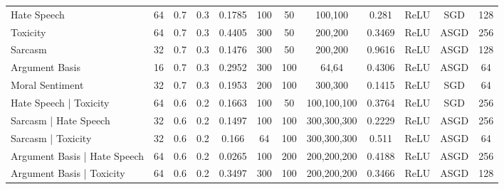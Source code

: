 \begin{landscape}
\begin{table}[]
{\begin{tabular}{l|ccccccccccc}
      Hate Speech                                       & 64         & 0.7              & 0.3              & 0.1785  & 100           & 50     & 100,100         & 0.281         & ReLU          & SGD       & 128        \\
      Toxicity                                          & 64         & 0.7              & 0.3              & 0.4405  & 300           & 50     & 200,200         & 0.3469        & ReLU          & ASGD      & 256        \\
      Sarcasm                                           & 32         & 0.7              & 0.3              & 0.1476  & 300           & 50     & 200,200         & 0.9616        & ReLU          & ASGD      & 128        \\
      Argument Basis                                    & 16         & 0.7              & 0.3              & 0.2952  & 300           & 100    & 64,64           & 0.4306        & ReLU          & ASGD      & 64         \\
      Moral Sentiment                                   & 32         & 0.7              & 0.3              & 0.1953  & 200           & 100    & 300,300         & 0.1415        & ReLU          & SGD       & 64         \\ \hline
      Hate Speech | Toxicity                            & 64         & 0.6              & 0.2              & 0.1663  & 100           & 50     & 100,100,100     & 0.3764        & ReLU          & SGD       & 256        \\
      Sarcasm | Hate Speech                             & 32         & 0.6              & 0.2              & 0.1497  & 100           & 100    & 300,300,300     & 0.2229        & ReLU          & ASGD      & 256        \\
      Sarcasm | Toxicity                                & 32         & 0.6              & 0.2              & 0.166   & 64            & 100    & 300,300,300     & 0.511         & ReLU          & ASGD      & 64         \\
      Argument Basis | Hate Speech                      & 64         & 0.6              & 0.2              & 0.0265  & 100           & 200    & 200,200,200     & 0.4188        & ReLU          & ASGD      & 256        \\
      Argument Basis | Toxicity                         & 64         & 0.6              & 0.2              & 0.3497  & 300           & 100    & 200,200,200     & 0.3466        & ReLU          & ASGD      & 128        \\

\end{tabular}}
\end{table}
\end{landscape}
